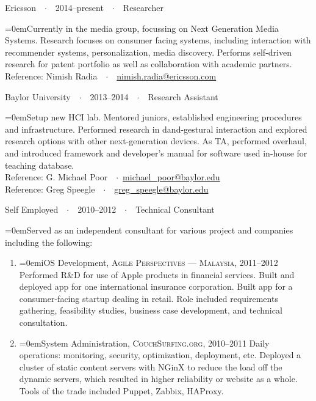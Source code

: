 \documentclass[a4paper]{scrartcl}
\newcommand{\Description}[1]{\hangindent=0em\hangafter=0\noindent\footnotesize{#1}\par\normalsize\vspace{1em}} %
\newcommand{\NewBlock}[3]{
    #1\ \ $\cdotp$\ \ #2\ \ $\cdotp$\ \ #3}
\newcommand{\BlockTitle}[1]{\textsc{\vspace{0.15em}}\noindent{\spacedlowsmallcaps{#1}}\vspace{1em}}
\begin{document}
\BlockTitle{Work Experience}

\NewBlock{Ericsson}{2014--present}{Researcher}

\Description{Currently in the media group, focussing on Next Generation Media Systems. Research focuses on consumer facing systems, including interaction with recommender systems, personalization, media discovery. Performs self-driven research for patent portfolio as well as collaboration with academic partners.
\\Reference: Nimish Radia\ \ $\cdotp$\ \ \href{mailto:nimish.radia@ericsson.com}{nimish.radia@ericsson.com}}

\NewBlock{Baylor University}{2013--2014}{Research Assistant}

\Description{Setup new HCI lab. Mentored juniors, established engineering procedures and infrastructure. Performed research in dand-gestural interaction and explored research options with other next-generation devices. As TA, performed overhaul, and introduced framework and developer's manual for software used in-house for teaching database. \\
Reference: G. Michael Poor\ \ $\cdotp$\ \href{mailto:michael\_poor@baylor.edu}{michael\_poor@baylor.edu} \\
Reference: Greg Speegle\ \ $\cdotp$\ \ \href{mailto:greg\_speegle@baylor.edu}{greg\_speegle@baylor.edu}}


\NewBlock{Self Employed}{2010--2012}{Technical Consultant}

\Description{Served as an independent consultant for various project and companies including the following:}
\begin{enumerate}
\item[] \Description{iOS Development, \textsc{Agile Perspectives --- Malaysia}, 2011--2012
\newline
Performed R\&D for use of Apple products in financial services. Built and deployed app for one international insurance corporation. Built app for a consumer-facing startup dealing in retail. Role included requirements gathering, feasibility studies, business case development, and technical consultation. }

\item[] \Description{System Administration, \textsc{CouchSurfing.org}, 2010--2011
\newline
Daily operations: monitoring, security, optimization, deployment, etc. Deployed a cluster of static content servers with NGinX to reduce the load off the dynamic servers, which resulted in higher reliability or website as a whole. Tools of the trade included Puppet, Zabbix, HAProxy. }
\end{enumerate}
\end{document}
